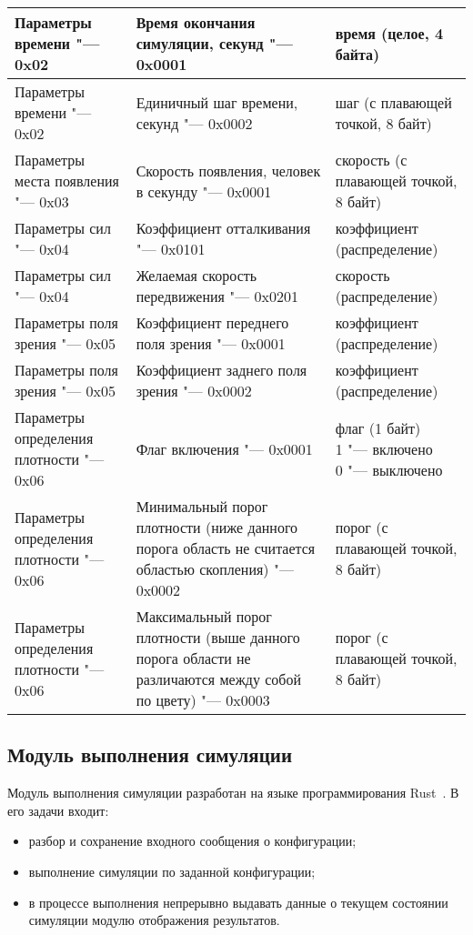 \begin{longtable}[ht]{| >{\centering}m{}
                      | >{\centering}m{}
                      | >{\centering\arraybackslash}m{}|}
  \hline Параметры времени "--- 0x02 & Время окончания симуляции, секунд "--- 0x0001 & время (целое, 4 байта) \tabularnewline
  \hline Параметры времени "--- 0x02 & Единичный шаг времени, секунд "--- 0x0002 & шаг (с плавающей точкой, 8 байт) \tabularnewline

  \hline Параметры места появления "--- 0x03 & Скорость появления, человек в секунду "--- 0x0001 & скорость (с плавающей точкой, 8 байт) \tabularnewline

  \hline Параметры сил "--- 0x04 & Коэффициент отталкивания "--- 0x0101 & коэффициент (распределение) \tabularnewline
  \hline Параметры сил "--- 0x04 & Желаемая скорость передвижения "--- 0x0201 & скорость (распределение) \tabularnewline

  \hline Параметры поля зрения "--- 0x05 & Коэффициент переднего поля зрения "--- 0x0001 & коэффициент (распределение) \tabularnewline
  \hline Параметры поля зрения "--- 0x05 & Коэффициент заднего поля зрения "--- 0x0002 & коэффициент (распределение) \tabularnewline

  \hline Параметры определения плотности "--- 0x06 & Флаг включения "--- 0x0001 & \specialcell{флаг (1 байт)\\
                                                                                               1 "--- включено\\
                                                                                               0 "--- выключено} \tabularnewline
  \hline Параметры определения плотности "--- 0x06 & Минимальный порог плотности (ниже данного порога область не считается областью скопления) "--- 0x0002 & порог (с плавающей точкой, 8 байт) \tabularnewline
  \hline Параметры определения плотности "--- 0x06 & Максимальный порог плотности (выше данного порога области не различаются между собой по цвету) "--- 0x0003 & порог (с плавающей точкой, 8 байт) \tabularnewline

  \hline
\end{longtable}

\subsection{Модуль выполнения симуляции}
\label{sec:development:core}

Модуль выполнения симуляции разработан на языке программирования Rust~\cite{rust_doc}.
В его задачи входит:
\begin{itemize}
  \item разбор и сохранение входного сообщения о конфигурации;
  \item выполнение симуляции по заданной конфигурации;
  \item в процессе выполнения непрерывно выдавать данные о текущем состоянии симуляции модулю отображения результатов.
\end{itemize}

